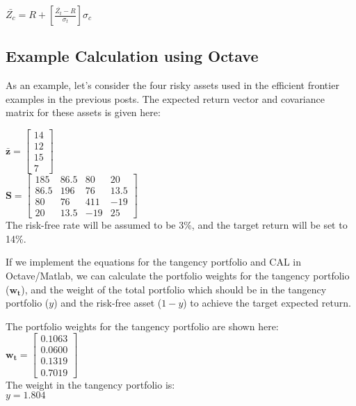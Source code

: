 \documentclass[12pt,a4paper]{article}
\begin{document}
$\bar{Z_c}=R+\left [ \frac{\bar{Z_t}-R}{\sigma_t} \right ]\sigma_c$\\

\subsection{Example Calculation using Octave}

As an example, let’s consider the four risky assets used in the efficient frontier examples in the previous posts.  The expected return vector and covariance matrix for these assets is given here:

$\mathbf{\bar{z}}=\begin{bmatrix} 14\\ 12\\ 15\\ 7 \end{bmatrix}$\\

$\mathbf{S}=\begin{bmatrix} 185& 86.5& 80& 20\\ 86.5& 196& 76& 13.5\\ 80& 76& 411& -19\\ 20& 13.5& -19& 25 \end{bmatrix}$\\

The risk-free rate will be assumed to be 3\%, and the target return will be set to 14\%.

If we implement the equations for the tangency portfolio and CAL in Octave/Matlab, we can calculate the portfolio weights for the tangency portfolio ($\mathbf{w_{t}}$), and the weight of the total portfolio which should be in the tangency portfolio ($y$) and the risk-free asset ($1-y$) to achieve the target expected return.

The portfolio weights for the tangency portfolio are shown here:\\

$\mathbf{w_{t}}=\begin{bmatrix} 0.1063\\ 0.0600\\ 0.1319\\ 0.7019 \end{bmatrix}$\\

The weight in the tangency portfolio is:\\

$y=1.804$\\
\end{document}
